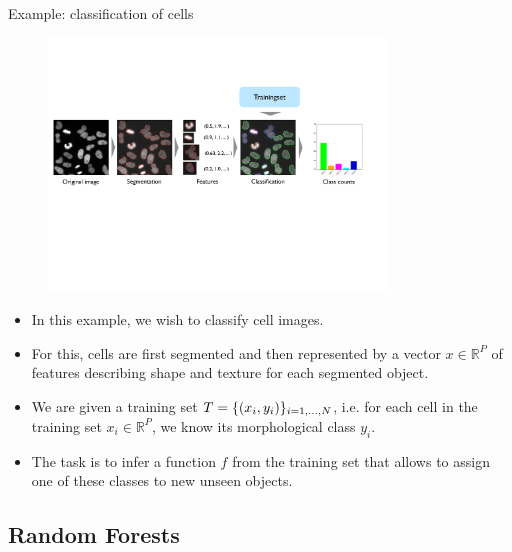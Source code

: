 \documentclass[xcolor=pdftex,dvipsnames,table]{beamer}
\begin{document}
\begin{frame}{Example: classification of cells}
\begin{figure}[htb]
\includegraphics[width=0.8\textwidth]{../graphics/ComputationalPhenotyping.pdf}
\end{figure}

\begin{itemize}
	\item In this example, we wish to classify cell images. 
	\item For this, cells are first segmented and then represented by a vector $x \in \mathbb{R}^P$ of features describing shape and texture for each segmented object.
	\item We are given a training set $T = \{(x_i, y_i)\}_{i=1, \ldots, N}$, i.e. for each cell in the training set $x_i \in \mathbb{R}^P$, we know its morphological class $y_i$. 
	\item The task is to infer a function $f$ from the training set that allows to assign one of these classes to new unseen objects.
\end{itemize}
\end{frame}

\subsection{Random Forests}
\end{document}
